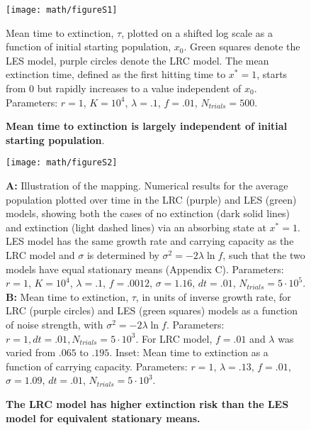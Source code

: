 \newpage

\renewcommand\thefigure{S1}    
\begin{figure}[h]
\centerline{
	\texttt{[image: math/figureS1]}}
	\caption{\textbf{Mean time to extinction is largely independent of initial starting population}.}  {Mean time to extinction, $\tau$, plotted on a shifted log scale as a function of initial starting population, $x_0$.  Green squares denote the LES model, purple circles denote the LRC model.  The mean extinction time, defined as the first hitting time to $x^* = 1$, starts from 0 but rapidly increases to a value independent of $x_0$.  Parameters:  $r = 1$, $K = 10^4$, $\lambda = .1$, $f = .01$, $N_{trials} = 500$.}
\end{figure}

\newpage
\renewcommand\thefigure{S2}    
\begin{figure}[h]
\centerline{
	\texttt{[image: math/figureS2]}}
	\caption{\textbf{The LRC model has higher extinction risk than the LES model for equivalent stationary means.}} {\textbf{A:} Illustration of the mapping.  Numerical results for the average population plotted over time in the LRC (purple) and LES (green) models, showing both the cases of no extinction (dark solid lines) and extinction (light dashed lines) via an absorbing state at $x^* = 1$.  LES model has the same growth rate and carrying capacity as the LRC model and $\sigma$ is determined by $\sigma^2 = -2\lambda\ln f$, such that the two models have equal stationary means (Appendix C).  Parameters:  $r = 1$, $K = 10^4$, $\lambda = .1$, $f = .0012$, $\sigma = 1.16$, $dt = .01$, $N_{trials} = 5\cdot 10^5$.  \textbf{B:}  Mean time to extinction, $\tau$, in units of inverse growth rate, for LRC (purple circles) and LES (green squares) models as a function of noise strength, with $\sigma^2 = -2\lambda\ln f$.   Parameters:  $r = 1, dt = .01, N_{trials} = 5\cdot 10^3$.  For LRC model, $f = .01$ and $\lambda$ was varied from $.065$ to $.195$.  Inset:  Mean time to extinction as a function of carrying capacity.  Parameters:  $r = 1$,  $\lambda = .13$, $f = .01$, $\sigma = 1.09$, $dt = .01$, $N_{trials} = 5\cdot 10^3$.}
\end{figure}




